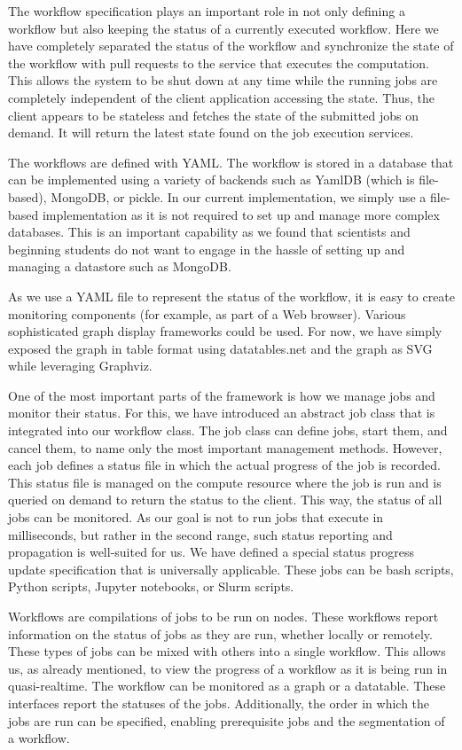 The workflow specification plays an important role in not only defining
a workflow but also keeping the status of a currently executed
workflow. Here we have completely separated the status of the workflow
and synchronize the state of the workflow with pull requests to the
service that executes the computation. This allows the system to be
shut down at any time while the running jobs are completely
independent of the client application accessing the state. Thus, the
client appears to be stateless and fetches the state of the submitted
jobs on demand. It will return the latest state found on the job
execution services.

The workflows are defined with YAML. The workflow is stored in a
database that can be implemented using a variety of backends such as
YamlDB (which is file-based), MongoDB, or pickle. In our current
implementation, we simply use a file-based implementation as it is not
required to set up and manage more complex databases. This is an
important capability as we found that scientists and beginning
students do not want to engage in the hassle of setting up and
managing a datastore such as MongoDB.

As we use a YAML file to represent the status of the workflow, it is
easy to create monitoring components (for example, as part of a Web
browser). Various sophisticated graph display frameworks could be
used. For now, we have simply exposed the graph in table format using
datatables.net and the graph as SVG while leveraging Graphviz.

One of the most important parts of the framework is how we manage jobs
and monitor their status. For this, we have introduced an abstract job
class that is integrated into our workflow class. The job class can define jobs, start them, and cancel them, to name only the
most important management methods. However, each job defines a status
file in which the actual progress of the job is recorded. This status
file is managed on the compute resource where the job is run and is
queried on demand to return the status to the client. This way, the
status of all jobs can be monitored. As our goal is not to run jobs
that execute in milliseconds, but rather in the second range, such
status reporting and propagation is well-suited for us. We have
defined a special status progress update specification that is
universally applicable. These jobs can be bash scripts, Python scripts,
Jupyter notebooks, or Slurm scripts.

Workflows are compilations of jobs to be run on nodes. These workflows
report information on the status of jobs as they are run, whether
locally or remotely. These types of jobs can be mixed
with others into a single workflow. This allows us, as already mentioned, 
to view the progress of a workflow as it is being run in quasi-realtime.
The workflow can be monitored as a graph or a datatable. These interfaces
report the statuses of the jobs. Additionally, the order in which the jobs
are run can be specified, enabling prerequisite jobs and the segmentation of a
workflow.

